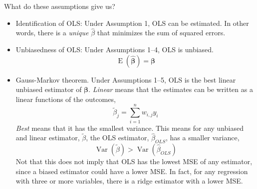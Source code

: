 \documentclass[]{book}
\providecommand{\tightlist}{%
  \setlength{\itemsep}{0pt}\setlength{\parskip}{0pt}}
\DeclareMathOperator{\E}{E}
\DeclareMathOperator{\Var}{Var}
\renewcommand{\vec}[1]{\boldsymbol{#1}}
\begin{document}
What do these assumptions give us?

\begin{itemize}
\tightlist
\item
  Identification of OLS: Under Assumption 1, OLS can be estimated. In
  other words, there is a \emph{unique} \(\hat\beta\) that minimizes the
  sum of squared errors.
\item
  Unbiasedness of OLS: Under Assumptions 1--4, OLS is unbiased. \[
  \E(\hat{\vec{\beta}}) = \vec{\beta}
  \]
\item
  Gauss-Markov theorem. Under Assumptions 1--5, OLS is the best linear
  unbiased estimator of \(\vec{\beta}\). \emph{Linear} means that the
  estimates can be written as a linear functions of the outcomes, \[
    \tilde{\beta}_j = \sum_{i = 1}^n w_{i,j} y_i
    \] \emph{Best} means that it has the smallest variance. This means
  for any unbiased and linear estimator, \(\tilde{\beta}\), the OLS
  estimator, \(\hat{\beta}_{OLS}\), has a smaller variance, \[
    \Var(\tilde{\beta}) > \Var(\hat{\beta}_{OLS})
    \] Not that this does not imply that OLS has the lowest MSE of any
  estimator, since a biased estimator could have a lower MSE. In fact,
  for any regression with three or more variables, there is a ridge
  estimator with a lower MSE.
\end{itemize}
\end{document}
